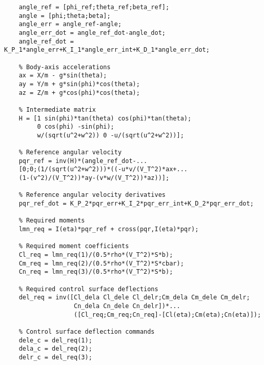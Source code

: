 \documentclass[a4paper, 12pt]{report}
\begin{document}
\begin{lstlisting}[style=matlabFrameTB, gobble=4]
	% Reference angle derivatives
	angle_ref = [phi_ref;theta_ref;beta_ref];
	angle = [phi;theta;beta];
	angle_err = angle_ref-angle;
	angle_err_dot = angle_ref_dot-angle_dot;
	angle_ref_dot = K_P_1*angle_err+K_I_1*angle_err_int+K_D_1*angle_err_dot;
	
	% Body-axis accelerations
	ax = X/m - g*sin(theta);
	ay = Y/m + g*sin(phi)*cos(theta);
	az = Z/m + g*cos(phi)*cos(theta);
	
	% Intermediate matrix
	H = [1 sin(phi)*tan(theta) cos(phi)*tan(theta);
	     0 cos(phi) -sin(phi);
	     w/(sqrt(u^2+w^2)) 0 -u/(sqrt(u^2+w^2))];
	
	% Reference angular velocity       
	pqr_ref = inv(H)*(angle_ref_dot-...
	[0;0;(1/(sqrt(u^2+w^2)))*((-u*v/(V_T^2)*ax+...
	(1-(v^2)/(V_T^2))*ay-(v*w/(V_T^2))*az))];
	
	% Reference angular velocity derivatives
	pqr_ref_dot = K_P_2*pqr_err+K_I_2*pqr_err_int+K_D_2*pqr_err_dot;
	
	% Required moments
	lmn_req = I(eta)*pqr_ref + cross(pqr,I(eta)*pqr);
	
	% Required moment coefficients
	Cl_req = lmn_req(1)/(0.5*rho*(V_T^2)*S*b);
	Cm_req = lmn_req(2)/(0.5*rho*(V_T^2)*S*cbar);
	Cn_req = lmn_req(3)/(0.5*rho*(V_T^2)*S*b);
	
	% Required control surface deflections
	del_req = inv([Cl_dela Cl_dele Cl_delr;Cm_dela Cm_dele Cm_delr;
	               Cn_dela Cn_dele Cn_delr])*...
	               ([Cl_req;Cm_req;Cn_req]-[Cl(eta);Cm(eta);Cn(eta)]);
	               
	% Control surface deflection commands
    dele_c = del_req(1);
    dela_c = del_req(2);
    delr_c = del_req(3);
\end{lstlisting}

	\printbibliography
	
\end{document}
